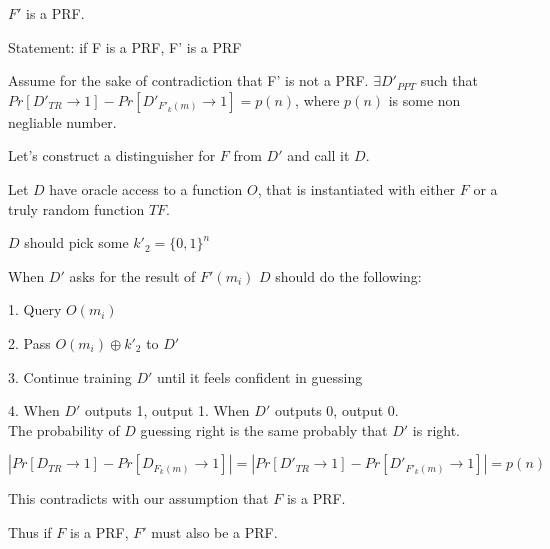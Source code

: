 \documentclass[12pt]{article}
\newenvironment{question}[2][Question]{\begin{trivlist}
		\item[\hskip \labelsep {\bfseries #1}\hskip \labelsep {\bfseries #2.}]}{\end{trivlist}}
\begin{document}
	\begin{question}{3b}	
		$F'$ is a PRF.
		
		Statement: if F is a PRF, F' is a PRF
		
		Assume for the sake of contradiction that F' is not a PRF. $\exists D'_{PPT}$ such that $Pr[D'_{TR} \rightarrow 1] - Pr[D'_{F'_k(m)}\rightarrow 1] = p(n)$, where $p(n)$ is some non negliable number.		 
		 
		Let's construct a distinguisher for $F$ from $D'$ and call it $D$.
		
		Let $D$ have oracle access to a function $O$, that is instantiated with either $F$ or a truly random function $TF$.
		
		$D$ should pick some $k'_2 = \{0,1\}^{n}$
		
		When $D'$ asks for the result of $F'(m_i)$ $D$ should do the following:
		
		\hspace{\parindent}	1. Query $O(m_i)$
		
		\hspace{\parindent} 2. Pass $O(m_i) \oplus k'_2$ to $D'$
		
		\hspace{\parindent} 3. Continue training $D'$ until it feels confident in guessing
		
		\hspace{\parindent} 4. When $D'$ outputs 1, output 1. When $D'$ outputs 0, output 0.\\ 
		
		
		The probability of $D$ guessing right is the same probably that $D'$ is right.
		
		$|Pr[D_{TR} \rightarrow 1]- Pr[D_{F_k(m)} \rightarrow 1]| = |Pr[D'_{TR} \rightarrow 1] - Pr[D'_{F'_k(m)}\rightarrow 1]| = p(n)$
		
		This contradicts with our assumption that $F$ is a PRF. 
		
		Thus if $F$ is a PRF, $F'$ must also be a PRF.
		
	\end{question}
\end{document}
